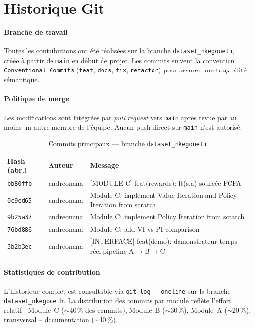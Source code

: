 \documentclass[12pt,a4paper]{article}
\begin{document}
\section{Historique Git}
\label{sec:gp:git}

\paragraph{Branche de travail}
Toutes les contributions ont \'{e}t\'{e} r\'{e}alis\'{e}es sur la branche
\texttt{dataset\_nkegoueth}, cr\'{e}\'{e}e \`{a} partir de \texttt{main}
en d\'{e}but de projet. Les commits suivent la convention
\texttt{Conventional Commits} (\texttt{feat}, \texttt{docs}, \texttt{fix},
\texttt{refactor}) pour assurer une traçabilit\'{e} s\'{e}mantique.

\paragraph{Politique de merge}
Les modifications sont int\'{e}gr\'{e}es par \textit{pull request} vers
\texttt{main} apr\`{e}s revue par au moins un autre membre de l'\'{e}quipe.
Aucun push direct sur \texttt{main} n'est autoris\'{e}.

\begin{table}[H]
\centering
\caption{Commits principaux --- branche \texttt{dataset\_nkegoueth}}
\label{tab:gp:commits}
\begin{tabular}{p{2.5cm}lp{7cm}}
\toprule
\textbf{Hash (abr.)} & \textbf{Auteur} & \textbf{Message} \\
\midrule
\texttt{bb80ffb} & andreonana & {[MODULE-C] feat(rewards): R(s,a) sourc\'{e}e FCFA} \\
\texttt{0c9ed65} & andreonana & {Module C: implement Value Iteration and Policy Iteration from scratch} \\
\texttt{9b25a37} & andreonana & {Module C: implement Policy Iteration from scratch} \\
\texttt{76bd886} & andreonana & {Module C: add VI vs PI comparison} \\
\texttt{3b2b3ec} & andreonana & {[INTERFACE] feat(demo): d\'{e}monstrateur temps r\'{e}el pipeline A$\to$B$\to$C} \\
\bottomrule
\end{tabular}
\end{table}

\paragraph{Statistiques de contribution}
L'historique complet est consultable via \texttt{git log -{}-oneline} sur
la branche \texttt{dataset\_nkegoueth}. La distribution des commits par
module refl\`{e}te l'effort relatif :
Module~C ($\sim$40\,\% des commits), Module~B ($\sim$30\,\%),
Module~A ($\sim$20\,\%), transversal -- documentation ($\sim$10\,\%).
\end{document}
